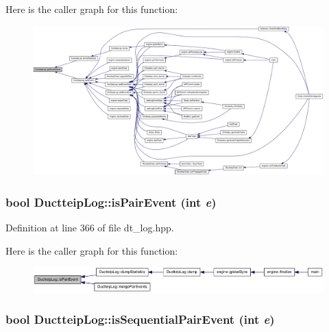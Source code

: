 Here is the caller graph for this function:\nopagebreak
\begin{figure}[H]
\begin{center}
\leavevmode
\includegraphics[width=420pt]{class_ductteip_log_a080df86b3f7167341da836494af41822_icgraph}
\end{center}
\end{figure}
\hypertarget{class_ductteip_log_a9dcfe59dfa97907c6464456bafe1fb7d}{
\subsubsection[{isPairEvent}]{\setlength{\rightskip}{0pt plus 5cm}bool DuctteipLog::isPairEvent (int {\em e})}}
\label{class_ductteip_log_a9dcfe59dfa97907c6464456bafe1fb7d}


Definition at line 366 of file dt\_\-log.hpp.

Here is the caller graph for this function:\nopagebreak
\begin{figure}[H]
\begin{center}
\leavevmode
\includegraphics[width=410pt]{class_ductteip_log_a9dcfe59dfa97907c6464456bafe1fb7d_icgraph}
\end{center}
\end{figure}
\hypertarget{class_ductteip_log_acca92822b7606cc0c5d384a3d96c7950}{
\subsubsection[{isSequentialPairEvent}]{\setlength{\rightskip}{0pt plus 5cm}bool DuctteipLog::isSequentialPairEvent (int {\em e})}}
\label{class_ductteip_log_acca92822b7606cc0c5d384a3d96c7950}



